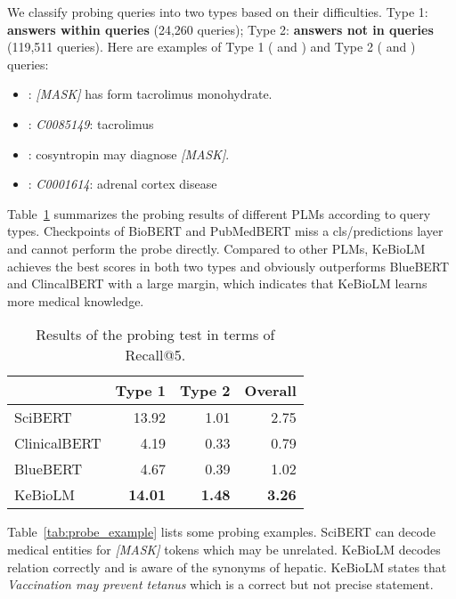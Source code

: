 \documentclass[11pt]{article}
\begin{document}
We classify probing queries into two types based on their difficulties.
Type 1: \textbf{answers within queries} (24,260 queries);
Type 2: \textbf{answers not in queries} (119,511 queries).
Here are examples of Type 1 ( and ) and Type 2 ( and ) queries:
\begin{itemize}
    \item : \textit{[MASK]} has form tacrolimus monohydrate.
    \item : \textit{C0085149}: tacrolimus
    \item : cosyntropin may diagnose \textit{[MASK]}.
    \item : \textit{C0001614}: adrenal cortex disease
\end{itemize}



Table~\ref{tab:probe} summarizes the probing results of different PLMs according to query types.
Checkpoints of BioBERT and PubMedBERT miss a cls/predictions layer and cannot perform the probe directly.
Compared to other PLMs, KeBioLM achieves the best scores in both two types and obviously outperforms BlueBERT and ClincalBERT with a large margin, which indicates that KeBioLM learns more medical knowledge.


\begin{table}
\centering
\begin{tabular}{lrrr}
\hline
&Type 1&Type 2&Overall\\
\hline
SciBERT&13.92&1.01&2.75\\
ClinicalBERT&4.19&0.33&0.79\\
BlueBERT&4.67&0.39&1.02\\
\hline
KeBioLM&\textbf{14.01}&\textbf{1.48}&\textbf{3.26}\\
\hline
\end{tabular}
\caption{Results of the probing test in terms of Recall@5.}
\label{tab:probe}
\end{table}

Table~\ref{tab:probe_example} lists some probing examples.
SciBERT can decode medical entities for \textit{[MASK]} tokens which may be unrelated.
KeBioLM decodes relation correctly and is aware of the synonyms of hepatic.
KeBioLM states that \textit{Vaccination may prevent tetanus} which is a correct but not precise statement.
\end{document}
